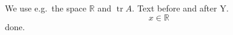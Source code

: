 \newcommand{\be}{\begin{equation}}
\def\ee{\end{equation}}
\newcommand\eg{e.g.\ }
\renewcommand*{\R}{\mathbb{R}}
\DeclareMathOperator{\tr}{tr}
We use \eg the space $\R$ and $\tr A$.
Text before
\newcommand{\y}{Y}
and after \y.
\be
x \in \R
\ee
done.
